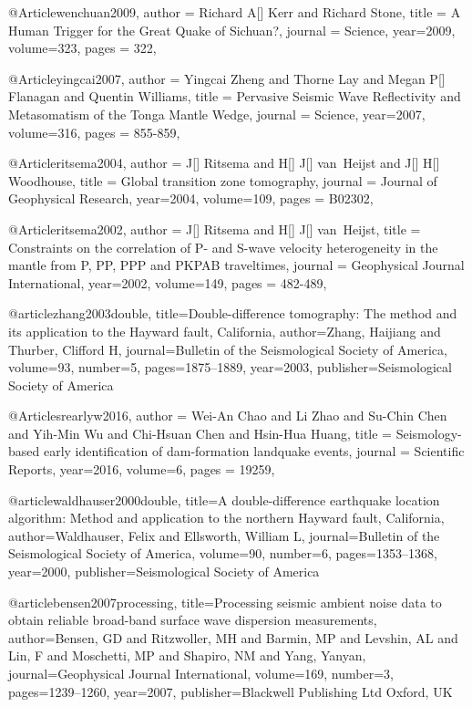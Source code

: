 @Article{wenchuan2009,
  author =	 {Richard A[] Kerr and Richard Stone},
  title =	 {A Human Trigger for the Great Quake of Sichuan?},
  journal =	 {Science},
  year=2009,
  volume=323,
  pages =	 {322},
}

@Article{yingcai2007,
  author =	 {Yingcai Zheng and Thorne Lay and Megan P[] Flanagan and Quentin Williams},
  title =	 {Pervasive Seismic Wave Reflectivity and Metasomatism of the Tonga Mantle Wedge},
  journal =	 {Science},
  year=2007,
  volume=316,
  pages =	 {855-859},
}

@Article{ritsema2004,
  author =	 {J[] Ritsema and H[] J[] van~Heijst and J[] H[] Woodhouse},
  title =	 {Global transition zone tomography},
  journal =	 {Journal of Geophysical Research},
  year=2004,
  volume=109,
  pages =	 {B02302},
}

@Article{ritsema2002,
  author =	 {J[] Ritsema and H[] J[] van~Heijst},
  title =	 {Constraints on the correlation of {P}- and {S}-wave velocity heterogeneity in the mantle from {P}, {PP}, {PPP} and {PKPAB} traveltimes},
  journal =	 {Geophysical Journal International},
  year=2002,
  volume=149,
  pages =	 {482-489},
}

@article{zhang2003double,
  title={Double-difference tomography: The method and its application to the Hayward fault, California},
  author={Zhang, Haijiang and Thurber, Clifford H},
  journal={Bulletin of the Seismological Society of America},
  volume={93},
  number={5},
  pages={1875--1889},
  year={2003},
  publisher={Seismological Society of America}
}

@Article{srearlyw2016,
  author =	 {Wei-An Chao and Li Zhao and Su-Chin Chen and Yih-Min Wu and Chi-Hsuan Chen and Hsin-Hua Huang},
  title =	 {Seismology-based early identification of dam-formation landquake events},
  journal =	 {Scientific Reports},
  year=2016,
  volume=6,
  pages =	 {19259},
}


@article{waldhauser2000double,
  title={A double-difference earthquake location algorithm: Method and application to the northern Hayward fault, California},
  author={Waldhauser, Felix and Ellsworth, William L},
  journal={Bulletin of the Seismological Society of America},
  volume={90},
  number={6},
  pages={1353--1368},
  year={2000},
  publisher={Seismological Society of America}
}

@article{bensen2007processing,
  title={Processing seismic ambient noise data to obtain reliable broad-band surface wave dispersion measurements},
  author={Bensen, GD and Ritzwoller, MH and Barmin, MP and Levshin, AL and Lin, F and Moschetti, MP and Shapiro, NM and Yang, Yanyan},
  journal={Geophysical Journal International},
  volume={169},
  number={3},
  pages={1239--1260},
  year={2007},
  publisher={Blackwell Publishing Ltd Oxford, UK}
}

